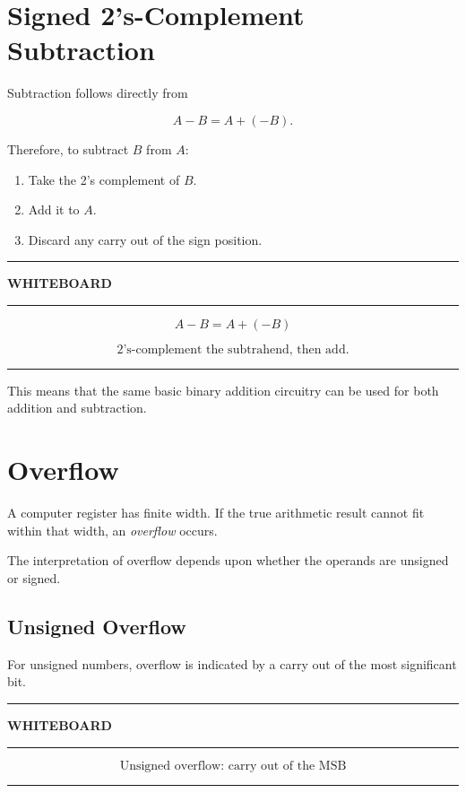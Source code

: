 \documentclass[11pt]{article}
\newenvironment{whiteboard}
{
    \par\medskip
    \begin{center}
    \begin{minipage}{0.94\textwidth}
    \hrule
    \vspace{0.4em}
    \textbf{\large WHITEBOARD}
    \vspace{0.3em}
    \hrule
    \vspace{0.7em}
}
{
    \vspace{0.5em}
    \hrule
    \end{minipage}
    \end{center}
    \medskip
}
\begin{document}
\section{Signed 2's-Complement Subtraction}

Subtraction follows directly from

\[
A-B=A+(-B).
\]

Therefore, to subtract \(B\) from \(A\):

\begin{enumerate}
    \item Take the 2's complement of \(B\).
    \item Add it to \(A\).
    \item Discard any carry out of the sign position.
\end{enumerate}

\begin{whiteboard}
\[
\boxed{A-B=A+(-B)}
\]

\[
\boxed{\text{2's-complement the subtrahend, then add.}}
\]
\end{whiteboard}

This means that the same basic binary addition circuitry can be used for both
addition and subtraction.

\section{Overflow}

A computer register has finite width. If the true arithmetic result cannot fit
within that width, an \emph{overflow} occurs.

The interpretation of overflow depends upon whether the operands are
unsigned or signed.

\subsection{Unsigned Overflow}

For unsigned numbers, overflow is indicated by a carry out of the most
significant bit.

\begin{whiteboard}
\[
\boxed{\text{Unsigned overflow: carry out of the MSB}}
\]
\end{whiteboard}
\end{document}
